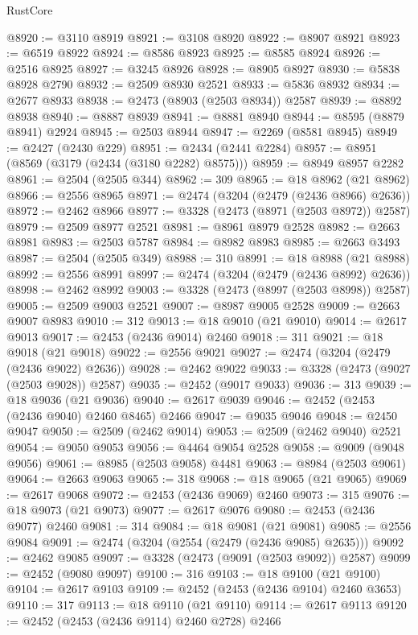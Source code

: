 \begin{lexlean}{RustCore}
\begin{coremodule}
@8920 := @3110 @8919
@8921 := @3108 @8920
@8922 := @8907 @8921
@8923 := @6519 @8922
@8924 := @8586 @8923
@8925 := @8585 @8924
@8926 := @2516 @8925
@8927 := @3245 @8926
@8928 := @8905 @8927
@8930 := @5838 @8928 @2790
@8932 := @2509 @8930 @2521
@8933 := @5836 @8932
@8934 := @2677 @8933
@8938 := @2473 (@8903 (@2503 @8934)) @2587
@8939 := @8892 @8938
@8940 := @8887 @8939
@8941 := @8881 @8940
@8944 := @8595 (@8879 @8941) @2924
@8945 := @2503 @8944
@8947 := @2269 (@8581 @8945)
@8949 := @2427 (@2430 @229)
@8951 := @2434 (@2441 @2284)
@8957 := @8951 (@8569 (@3179 (@2434 (@3180 @2282) @8575)))
@8959 := @8949 @8957 @2282
@8961 := @2504 (@2505 @344)
@8962 := 309
@8965 := @18 @8962 (@21 @8962)
@8966 := @2556 @8965
@8971 := @2474 (@3204 (@2479 (@2436 @8966) @2636))
@8972 := @2462 @8966
@8977 := @3328 (@2473 (@8971 (@2503 @8972)) @2587)
@8979 := @2509 @8977 @2521
@8981 := @8961 @8979 @2528
@8982 := @2663 @8981
@8983 := @2503 @5787
@8984 := @8982 @8983
@8985 := @2663 @3493
@8987 := @2504 (@2505 @349)
@8988 := 310
@8991 := @18 @8988 (@21 @8988)
@8992 := @2556 @8991
@8997 := @2474 (@3204 (@2479 (@2436 @8992) @2636))
@8998 := @2462 @8992
@9003 := @3328 (@2473 (@8997 (@2503 @8998)) @2587)
@9005 := @2509 @9003 @2521
@9007 := @8987 @9005 @2528
@9009 := @2663 @9007 @8983
@9010 := 312
@9013 := @18 @9010 (@21 @9010)
@9014 := @2617 @9013
@9017 := @2453 (@2436 @9014) @2460
@9018 := 311
@9021 := @18 @9018 (@21 @9018)
@9022 := @2556 @9021
@9027 := @2474 (@3204 (@2479 (@2436 @9022) @2636))
@9028 := @2462 @9022
@9033 := @3328 (@2473 (@9027 (@2503 @9028)) @2587)
@9035 := @2452 (@9017 @9033)
@9036 := 313
@9039 := @18 @9036 (@21 @9036)
@9040 := @2617 @9039
@9046 := @2452 (@2453 (@2436 @9040) @2460 @8465) @2466
@9047 := @9035 @9046
@9048 := @2450 @9047
@9050 := @2509 (@2462 @9014)
@9053 := @2509 (@2462 @9040) @2521
@9054 := @9050 @9053
@9056 := @4464 @9054 @2528
@9058 := @9009 (@9048 @9056)
@9061 := @8985 (@2503 @9058) @4481
@9063 := @8984 (@2503 @9061)
@9064 := @2663 @9063
@9065 := 318
@9068 := @18 @9065 (@21 @9065)
@9069 := @2617 @9068
@9072 := @2453 (@2436 @9069) @2460
@9073 := 315
@9076 := @18 @9073 (@21 @9073)
@9077 := @2617 @9076
@9080 := @2453 (@2436 @9077) @2460
@9081 := 314
@9084 := @18 @9081 (@21 @9081)
@9085 := @2556 @9084
@9091 := @2474 (@3204 (@2554 (@2479 (@2436 @9085) @2635)))
@9092 := @2462 @9085
@9097 := @3328 (@2473 (@9091 (@2503 @9092)) @2587)
@9099 := @2452 (@9080 @9097)
@9100 := 316
@9103 := @18 @9100 (@21 @9100)
@9104 := @2617 @9103
@9109 := @2452 (@2453 (@2436 @9104) @2460 @3653)
@9110 := 317
@9113 := @18 @9110 (@21 @9110)
@9114 := @2617 @9113
@9120 := @2452 (@2453 (@2436 @9114) @2460 @2728) @2466

\end{coremodule}
\end{lexlean}
